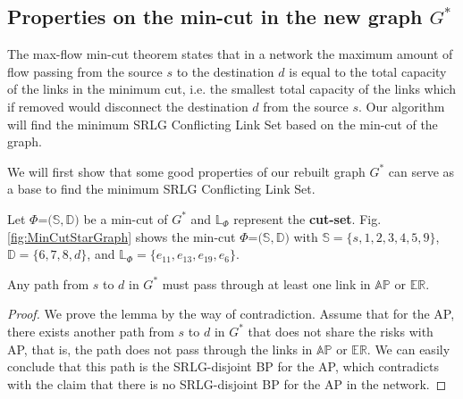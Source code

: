 \subsection{Properties on the min-cut in the new graph $G^*$}
\label{subsec:Properties on the min-cut in the new graph $G^*$}
The max-flow min-cut theorem states that in a  network the maximum amount of flow passing from the source $s$ to the destination $d$ is equal to the total capacity of the links in the minimum cut, i.e. the smallest total capacity of the links which if removed would disconnect the destination $d$ from the source $s$.  Our algorithm will find the minimum SRLG Conflicting Link Set based on the min-cut of the graph.

We will first show that some good properties of our rebuilt graph $G^*$ can serve as a base to find the minimum SRLG Conflicting Link Set.


Let $\Phi$=${(\mathbb{S}},{\mathbb{D}})$ be a min-cut of $G^*$ and $\mathbb{L}_{\Phi}$  represent the \textbf{cut-set}. Fig.\ref{fig:MinCutStarGraph} shows the min-cut $\Phi$=${(\mathbb{S}},{\mathbb{D}})$ with ${\mathbb{S}}=\{s, 1, 2, 3, 4, 5, 9\}$,  ${\mathbb{D}}=\{6, 7, 8, d\}$, and $\mathbb{L}_{\Phi}=\{e_{11}, e_{13}, e_{19}, e_6\}$.





\begin{lemma}
\label{le:lemma1}
    Any path from $s$ to $d$ in $G^*$ must pass through at least one link in $\mathbb{AP}$ or $\mathbb{\mathbb{ER}}$.
\end{lemma}
\begin{proof}
We prove the lemma by the way of contradiction. Assume that for the AP, there exists another path from  $s$ to $d$ in $G^*$ that does not share the risks with  AP, that is, the path does not pass through the links in $\mathbb{AP}$ or $\mathbb{\mathbb{ER}}$. We can easily conclude that this path is the SRLG-disjoint BP for the AP, which contradicts with the claim that there is no SRLG-disjoint BP for the AP in the network.
\end{proof}

